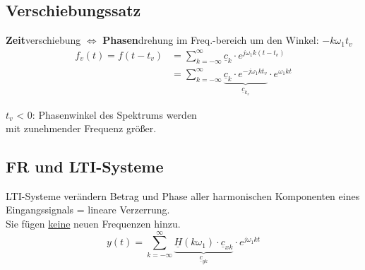 \subsection{Verschiebungssatz}
\textbf{Zeit}verschiebung $\Leftrightarrow$ \textbf{Phasen}drehung im Freq.-bereich um den Winkel: $-k\omega_1 t_v$
\begin{align*}
	f_v(t) = f(t-t_v) & = \sum_{k=-\infty}^{\infty} \underline{c}_k\cdot e^{j\omega_1 k (t-t_v)}                                                       \\
	                  & = \sum_{k=-\infty}^{\infty} \underbrace{\underline{c}_k\cdot e^{-j\omega_1 k t_v}}_{\underline{c}_{k_v}} \cdot e^{\omega_1 k t}
\end{align*}

$t_v$ < 0: Phasenwinkel des Spektrums werden\\ mit
zunehmender Frequenz größer.

\subsection{FR und LTI-Systeme}
{\small LTI-Systeme verändern Betrag und Phase aller harmonischen Komponenten eines Eingangssignals = lineare Verzerrung.\\
Sie fügen \underline{keine} neuen Frequenzen hinzu.}
\[
	y(t) = \sum_{k=-\infty}^{\infty} \underbrace{\underline{H}(k\omega_1)\cdot\underline{c}_{xk}}_{\underline{c}_{yk}} \cdot e^{j\omega_1 k t}
\]
